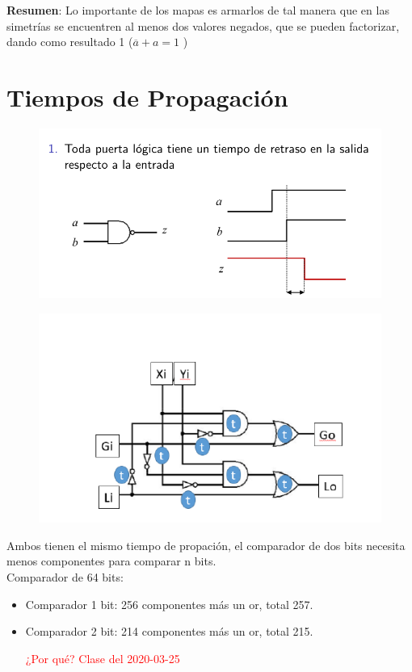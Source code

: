 \documentclass[12pt,letterpaper]{book}
\begin{document}
\textbf{Resumen}: Lo importante de los mapas es armarlos de tal manera que en las simetrías se encuentren al menos dos valores negados, que se pueden factorizar, dando como resultado 1 ($\overline{a}+a=1 $ ) 

\section{Tiempos de Propagación}



\begin{figure}[H]
\centering
\includegraphics[width=1\linewidth]{figures/tiePro.png}
\caption{}
\label{tiePro}
\end{figure}
\vspace{0.2cm}


\begin{figure}[H]
\centering
\includegraphics[width=1\linewidth]{figures/tiePro2.png}
\caption{}
\label{tiePro2}
\end{figure}
\vspace{0.2cm}

Ambos tienen el mismo tiempo de propación, el comparador de dos bits necesita menos componentes para comparar n bits. \\
Comparador de 64 bits:\\
\begin{itemize}
\item Comparador 1 bit: 256 componentes más un or, total 257. 
\item Comparador 2 bit: 214 componentes más un or, total 215.

\textcolor{red}{¿Por qué? Clase del 2020-03-25}


\end{itemize}
\end{document}
